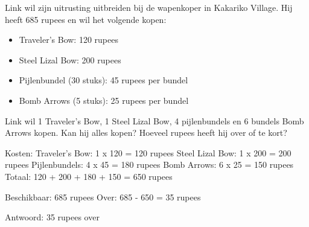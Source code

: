 \begin{opgave}
Link wil zijn uitrusting uitbreiden bij de wapenkoper in Kakariko Village.
Hij heeft 685 rupees en wil het volgende kopen:

\begin{itemize}
\item Traveler's Bow: 120 rupees
\item Steel Lizal Bow: 200 rupees
\item Pijlenbundel (30 stuks): 45 rupees per bundel
\item Bomb Arrows (5 stuks): 25 rupees per bundel
\end{itemize}

Link wil 1 Traveler's Bow, 1 Steel Lizal Bow, 4 pijlenbundels en 6 bundels
Bomb Arrows kopen. Kan hij alles kopen? Hoeveel rupees heeft hij over of te kort?
\end{opgave}

\begin{oplossing}
Kosten:
Traveler's Bow: 1 x 120 = 120 rupees
Steel Lizal Bow: 1 x 200 = 200 rupees
Pijlenbundels: 4 x 45 = 180 rupees
Bomb Arrows: 6 x 25 = 150 rupees
Totaal: 120 + 200 + 180 + 150 = 650 rupees

Beschikbaar: 685 rupees
Over: 685 - 650 = 35 rupees

Antwoord: 35 rupees over
\end{oplossing}